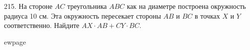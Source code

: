 215. На стороне  $AC$ треугольника  $ABC$ как на диаметре построена окружность радиуса 10 см. Эта
окружность пересекает стороны  $AB$ и  $BC$ в точках  $X$ и  $Y$ соответственно. Найдите  $AX\cdot AB + CY\cdot BC.$

ewpage
